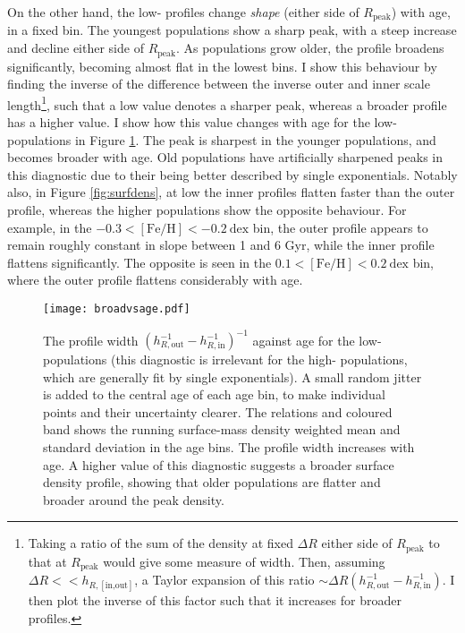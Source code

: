 On the other hand, the low-\afe{} profiles change \emph{shape} (either side of $R_{\mathrm{peak}}$) with age, in a fixed \feh{} bin. The youngest populations show a sharp peak, with a steep increase and decline either side of $R_{\mathrm{peak}}$. As populations grow older, the profile broadens significantly, becoming almost flat in the lowest \feh{} bins. I show this behaviour by finding the inverse of the difference between the inverse outer and inner scale length\footnote{Taking a ratio of the sum of the density at fixed $\Delta R$ either side of $R_{\mathrm{peak}}$ to that at $R_{\mathrm{peak}}$ would give some measure of width. Then, assuming $\Delta R << h_{R,[\text{in,out}]}$, a Taylor expansion of this ratio $\sim \Delta R (h_{R,\text{out}}^{-1}-h_{R,\text{in}}^{-1})$. I then plot the inverse of this factor such that it increases for broader profiles.}, such that a low value denotes a sharper peak, whereas a broader profile has a higher value. I show how this value changes with age for the low-\afe{} populations in Figure \ref{fig:agevsbroadening}. The peak is sharpest in the younger populations, and becomes broader with age. Old populations have artificially sharpened peaks in this diagnostic due to their being better described by single exponentials. Notably also, in Figure \ref{fig:surfdens}, at low \feh{} the inner profiles flatten faster than the outer profile, whereas the higher \feh{} populations show the opposite behaviour. For example, in the $-0.3 < \mathrm{[Fe/H]} < -0.2\ \mathrm{dex}$ bin, the outer profile appears to remain roughly constant in slope between 1 and 6 Gyr, while the inner profile flattens significantly. The opposite is seen in the $0.1 < \mathrm{[Fe/H]} < 0.2\ \mathrm{dex}$ bin, where the outer profile flattens considerably with age. 

 \begin{figure}
 	\texttt{[image: broadvsage.pdf]}
     \caption[The broadening of surface density profiles as a function of age in the low-\afe{} mono-age, mono-\feh{} populations]{The profile width $(h_{R,\mathrm{out}}^{-1} - h_{R,\mathrm{in}}^{-1})^{-1}$ against age for the low-\afe{} populations (this diagnostic is irrelevant for the high-\afe{} populations, which are generally fit by single exponentials). A small random jitter is added to the central age of each age bin, to make individual points and their uncertainty clearer. The relations and coloured band shows the running surface-mass density weighted mean and standard deviation in the age bins. The profile width increases with age. A higher value of this diagnostic suggests a broader surface density profile, showing that older populations are flatter and broader around the peak density.}
     \label{fig:agevsbroadening}
 \end{figure}



